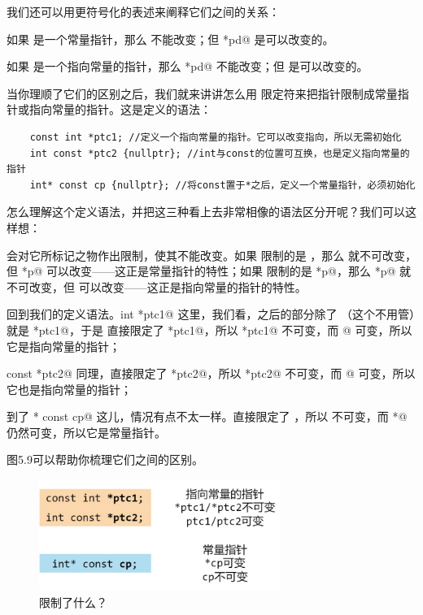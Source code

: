 我们还可以用更符号化的表述来阐释它们之间的关系：\par
如果 \lstinline@pd@ 是一个常量指针，那么 \lstinline@pd@ 不能改变；但 \lstinline@*pd@ 是可以改变的。\par
如果 \lstinline@pd@ 是一个指向常量的指针，那么 \lstinline@*pd@ 不能改变；但 \lstinline@pd@ 是可以改变的。\par
当你理顺了它们的区别之后，我们就来讲讲怎么用 \lstinline@const@ 限定符来把指针限制成常量指针或指向常量的指针。这是定义的语法：
\begin{lstlisting}
    const int *ptc1; //定义一个指向常量的指针。它可以改变指向，所以无需初始化
    int const *ptc2 {nullptr}; //int与const的位置可互换，也是定义指向常量的指针
    int* const cp {nullptr}; //将const置于*之后，定义一个常量指针，必须初始化
\end{lstlisting}
怎么理解这个定义语法，并把这三种看上去非常相像的语法区分开呢？我们可以这样想：\par
\lstinline@const@ 会对它所标记之物作出限制，使其不能改变。如果 \lstinline@const@ 限制的是 \lstinline@p@，那么 \lstinline@p@ 就不可改变，但 \lstinline@*p@ 可以改变——这正是常量指针的特性；如果 \lstinline@const@ 限制的是 \lstinline@*p@，那么 \lstinline@*p@ 就不可改变，但 \lstinline@p@ 可以改变——这正是指向常量的指针的特性。\par
回到我们的定义语法。\lstinline@const int *ptc1@ 这里，我们看，\lstinline@const@ 之后的部分除了 \lstinline@int@（这个不用管）就是 \lstinline@*ptc1@，于是 \lstinline@const@ 直接限定了 \lstinline@*ptc1@，所以 \lstinline@*ptc1@ 不可变，而 @ 可变，所以它是指向常量的指针；\par
\lstinline@int const *ptc2@ 同理，\lstinline@const@ 直接限定了 \lstinline@*ptc2@，所以 \lstinline@*ptc2@ 不可变，而 @ 可变，所以它也是指向常量的指针；\par
到了 \lstinline@int* const cp@ 这儿，情况有点不太一样。\lstinline@const@ 直接限定了 \lstinline@cp@，所以 \lstinline@cp@ 不可变，而 \lstinline@cp*@ 仍然可变，所以它是常量指针。\par
图5.9可以帮助你梳理它们之间的区别。\par
\begin{figure}[htbp]
    \centering
    \includegraphics[width=0.7\textwidth]{../images/generalized_parts/05_definition_of_constant_pointer_and_pointer_to_const.drawio.png}
    \caption{\lstinline@const@ 限制了什么？}
\end{figure}
